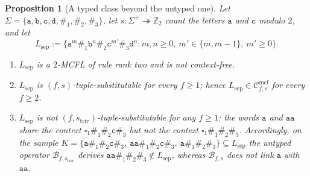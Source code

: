 \documentclass[11pt]{article}
\numberwithin{equation}{section}
\theoremstyle{plain}
\newtheorem{proposition}[theorem]{Proposition}
\theoremstyle{definition}
\theoremstyle{remark}
\newcommand{\Cmcf}[2]{\mathcal{C}^{\mathrm{mcf}}_{#1,#2}}
\newcommand{\blank}{\square}
\theoremstyle{plain}
\begin{document}
\begin{proposition}[A typed class beyond the untyped one]
\label{prop:typed-separation}
Let $\Sigma=\{\mathtt a,\mathtt b,\mathtt c,\mathtt d,\mathtt\#_1,\mathtt\#_2,\mathtt\#_3\}$, let
$s:\Sigma^+\twoheadrightarrow\mathbb Z_2$ count the letters $\mathtt a$ and $\mathtt c$
modulo $2$, and let
\[
 L_{\mathrm{sep}}:=\{\mathtt a^m\mathtt\#_1\mathtt b^n\mathtt\#_2\mathtt c^{m'}\mathtt\#_3\mathtt d^n:
 m,n\ge0,\ m'\in\{m,m-1\},\ m'\ge0\}.
\]
\begin{enumerate}[label=\textup{(\roman*)},leftmargin=*]
\item $L_{\mathrm{sep}}$ is a $2$-MCFL of rule rank two and is not context-free.
\item $L_{\mathrm{sep}}$ is $(f,s)$-tuple-substitutable for every $f\ge1$; hence
$L_{\mathrm{sep}}\in\Cmcf{f}{s}$ for every $f\ge2$.
\item $L_{\mathrm{sep}}$ is not $(f,s_{\mathrm{triv}})$-tuple-substitutable for any $f\ge1$:
the words $\mathtt a$ and $\mathtt a\mathtt a$ share the context
$\blank_1\mathtt\#_1\mathtt\#_2\mathtt c\mathtt\#_3$ but not the context
$\blank_1\mathtt\#_1\mathtt\#_2\mathtt\#_3$.  Accordingly, on the sample
$K=\{\mathtt a\mathtt\#_1\mathtt\#_2\mathtt c\mathtt\#_3,\
\mathtt a\mathtt a\mathtt\#_1\mathtt\#_2\mathtt c\mathtt\#_3,\
\mathtt a\mathtt\#_1\mathtt\#_2\mathtt\#_3\}\subseteq L_{\mathrm{sep}}$ the untyped operator
$\mathcal B_{f,s_{\mathrm{triv}}}$ derives
$\mathtt a\mathtt a\mathtt\#_1\mathtt\#_2\mathtt\#_3\notin L_{\mathrm{sep}}$, whereas
$\mathcal B_{f,s}$ does not link $\mathtt a$ with $\mathtt a\mathtt a$.
\end{enumerate}
\end{proposition}
\end{document}
